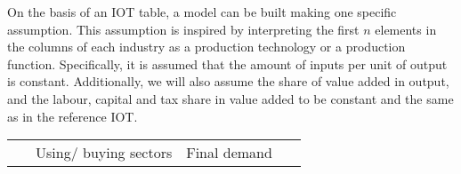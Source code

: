 \documentclass[12pt,english]{article}
\begin{document}
On the basis of an IOT table, a model can be built making one specific assumption. This assumption is inspired by interpreting the first $n$ elements in the columns of each industry as a production technology or a production function. Specifically, it is assumed that the amount of inputs per unit of output is constant. Additionally, we will also assume the share of value added in output, and the labour, capital and tax share in value added to be constant and the same as in the reference IOT.

\begin{table}[!t]
	\centering
	\begin{adjustbox}{width=\textwidth}
		\renewcommand*{\arraystretch}{1.15}
		\small
		\begin{tabular}{cr|ccccc|b{30pt}b{30pt}p{30pt}b{30pt}b{30pt}|c|c}
			\multicolumn{2}{c}{\ }		& \multicolumn{5}{c}{Using/ buying sectors} & \multicolumn{5}{c}{Final demand}  &  \multicolumn{2}{c}{\ }	   \\
			

\end{tabular}
\end{adjustbox}
\end{table}
\end{document}
